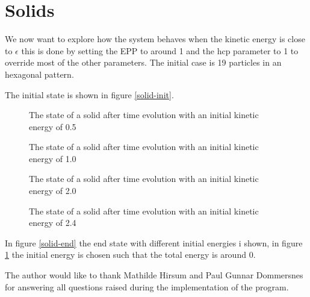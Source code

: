 \documentclass[10pt,a4paper,aps,twocolumn,secnumarabic,numerical,balancelastpage,nofootinbib,superscriptaddress]{revtex4-2}
\begin{document}
	\section{Solids}
	We now want to explore how the system behaves when the kinetic energy is close to $\epsilon$ this is done by setting the EPP to around 1 and the hcp parameter to 1 to override most of the other parameters. The initial case is 19 particles in an hexagonal pattern.
	\begin{figure*}
		\centering
		\scalebox{0.7}{}
		\caption{\label{solid-init}The initial state of the solid, 19 particles packed in a hexagonal formation.}
	\end{figure*}
	The initial state is shown in figure \ref{solid-init}.
	\begin{figure*}[htb]
		\centering
		\begin{subfigure}{.45\textwidth}
			\hspace*{-2.6cm}\scalebox{0.9}{}
			\caption{The state of a solid after time evolution with an initial kinetic energy of 0.5}
		\end{subfigure}
		\begin{subfigure}{.45\textwidth}
			\hspace*{-2.6cm}\scalebox{0.9}{}
			\caption{The state of a solid after time evolution with an initial kinetic energy of 1.0}
		\end{subfigure}
		\begin{subfigure}{.45\textwidth}
			\hspace*{-2.6cm}\scalebox{0.9}{}
			\caption{The state of a solid after time evolution with an initial kinetic energy of 2.0}
		\end{subfigure}
		\begin{subfigure}{.45\textwidth}
			\hspace*{-2.6cm}\scalebox{0.9}{}
			\caption{\label{solid-24}The state of a solid after time evolution with an initial kinetic energy of 2.4}
		\end{subfigure}
		\caption{\label{solid-end}Path of one particle with different values of time step $dt$}
	\end{figure*}
	In figure \ref{solid-end} the end state with different initial energies i shown, in figure \ref{solid-24} the initial energy is chosen such that the total energy is around 0. 
	
	\begin{acknowledgments}
		The author would like to thank Mathilde Hirsum and Paul Gunnar Dommersnes for answering all questions raised during the implementation of the program.
	\end{acknowledgments}
	\appendix
	
\end{document}
